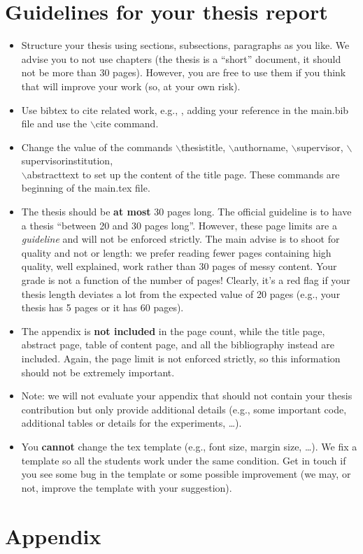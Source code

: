 \documentclass[oneside, a4paper, onecolumn, 11pt]{article}
\begin{document}
\newpage

\section{Guidelines for your thesis report}

\begin{itemize}
    \item Structure your thesis using sections, subsections, paragraphs as you like. We advise you to not use chapters (the thesis is a ``short'' document, it should not be more than 30 pages). However, you are free to use them if you think that will improve your work (so, at your own risk).
    \item Use bibtex to cite related work, e.g., \cite{DBLP:journals/x/Turing37}, adding your reference in the {main.bib} file and use the {$\backslash$cite} command.
    \item Change the value of the commands {$\backslash$thesistitle}, {$\backslash$authorname}, {$\backslash$supervisor}, {$\backslash$supervisorinstitution}, \\ {$\backslash$abstracttext} to set up the content of the title page. These commands are beginning of the {main.tex} file.
    \item The thesis should be \textbf{at most} 30 pages long. The official guideline is to have a thesis ``between 20 and 30 pages long''. However, these page limits are a \emph{guideline} and will not be enforced strictly.
          The main advise is to shoot for quality and not or length: we prefer reading fewer pages containing high quality, well explained, work rather than 30 pages of messy content. Your grade is not a function of the number of pages!
          Clearly, it's a red flag if your thesis length deviates a lot from the expected value of 20 pages (e.g., your thesis has 5 pages or it has 60 pages).
    \item The appendix is \textbf{not included} in the page count, while the title page, abstract page, table of content page, and all the bibliography instead are included. Again, the page limit is not enforced strictly, so this information should not be extremely important.
    \item Note: we will not evaluate your appendix that should not contain your thesis contribution but only provide additional details (e.g., some important code, additional tables or details for the experiments, \ldots).
    \item You \textbf{cannot} change the tex template (e.g., font size, margin size, \ldots). We fix a template so all the students work under the same condition. Get in touch if you see some bug in the template or some possible improvement (we may, or not, improve the template with your suggestion).
\end{itemize}

\newpage



\newpage
\appendix

\section{Appendix}
\label{sec:appendix}
\end{document}
